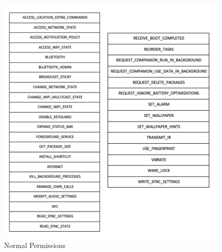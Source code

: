\documentclass[12pt,twoside]{report}
\begin{document}
\begin{figure}
    \centering
    \includegraphics{figures/Normal.png}
    \caption{Normal Permissions}
    \label{fig:my_label}
\end{figure}
\end{document}
